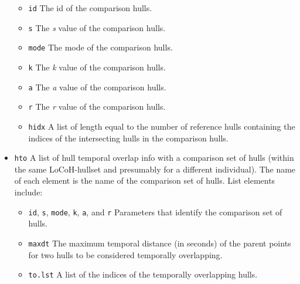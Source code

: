 \documentclass{article}
\begin{document}
\begin{itemize}
    \begin{itemize}
      \item \texttt{id} The id of the comparison hulls.
      \item \texttt{s} The \textit{s} value of the comparison hulls.
      \item \texttt{mode} The mode of the comparison hulls.
      \item \texttt{k} The \textit{k} value of the comparison hulls.
      \item \texttt{a} The \textit{a} value of the comparison hulls.
      \item \texttt{r} The \textit{r} value of the comparison hulls.
      \item \texttt{hidx} A list of length equal to the number of reference hulls containing the indices of the intersecting hulls in the comparison hulls.
    \end{itemize}

  \item \texttt{hto} A list of hull temporal overlap info with a comparison set of hulls (within the same LoCoH-hullset and presumably for a different individual). The name of each element is the name of the comparison set of hulls. List elements include:

    \begin{itemize}
      \item \texttt{id}, \texttt{s}, \texttt{mode}, \texttt{k}, \texttt{a}, and \texttt{r} Parameters that identify the comparison set of hulls.
      \item \texttt{maxdt} The maximum temporal distance (in seconds) of the parent points for two hulls to be considered temporally overlapping.
      \item \texttt{to.lst} A list of the indices of the temporally overlapping hulls.  
    \end{itemize}  

\end{itemize}
\end{document}
